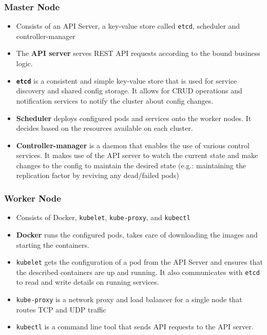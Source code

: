 \documentclass{article}
\begin{document}
\subsubsection{Master Node}
\begin{itemize}
    \item Consists of an API Server, a key-value store called \texttt{etcd}, scheduler and controller-manager
    
    \item The \textbf{API server} serves REST API requests according to the bound business logic. 
    
    \item \textbf{\texttt{etcd}} is a consistent and simple key-value store that is used for service discovery and shared config storage. It allows for CRUD operations and notification services to notify the cluster about config changes.
    
    \item \textbf{Scheduler} deploys configured pods and services onto the worker nodes. It decides based on the resources available on each cluster. 
    
    \item \textbf{Controller-manager} is a daemon that enables the use of various control services. It makes use of the API server to watch the current state and make changes to the config to maintain the desired state (e.g.: maintaining the replication factor by reviving any dead/failed pods) 
\end{itemize}

\subsubsection{Worker Node}
\begin{itemize}
    \item Consists of Docker, \texttt{kubelet}, \texttt{kube-proxy}, and \texttt{kubectl}
    
    \item \textbf{Docker} runs the configured pods, takes care of downloading the images and starting the containers.
    
    \item \texttt{kubelet} gets the configuration of a pod from the API Server and ensures that the described containers are up and running. It also communicates with \texttt{etcd} to read and write details on running services.
    
    \item \texttt{kube-proxy} is a network proxy and load balancer for a single node that routes TCP and UDP traffic 
    
    \item \texttt{kubectl} is a command line tool that sends API requests to the API server.
\end{itemize}
\end{document}
